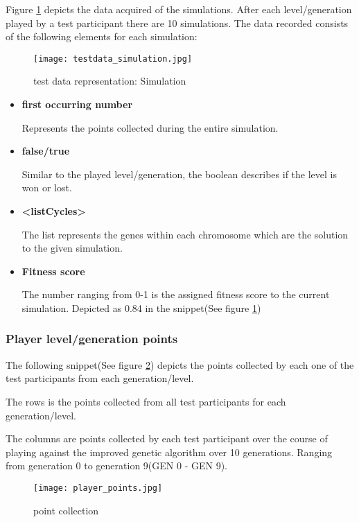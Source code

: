 \newpage
Figure \ref{fig:testdata_simulation} depicts the data acquired of the simulations. After each level/generation played by a test participant there are 10 simulations.
The data recorded consists of the following elements for each simulation:

\begin{figure}[!htbp]
\centering
\texttt{[image: testdata\_simulation.jpg]}
\caption{test data representation: Simulation}
\label{fig:testdata_simulation}
\end{figure}

\begin{itemize}
\item \textbf{first occurring number}

Represents the points collected during the entire simulation.

\item  \textbf{false/true}

Similar to the played level/generation, the boolean describes if the level is won or lost.

\item \textbf{<listCycles>}

The list represents the genes within each chromosome which are the solution to the given simulation.

\item \textbf{Fitness score}

The number ranging from 0-1 is the assigned fitness score to the current simulation. Depicted as 0.84 in the snippet(See figure \ref{fig:testdata_simulation})
\end{itemize}
\newpage
\subsubsection{Player level/generation points}
The following snippet(See figure \ref{fig:point_collection}) depicts the points collected by each one of the test participants from each generation/level.


The rows is the points collected from all test participants for each generation/level.

The columns are points collected by each test participant over the course of playing against the improved genetic algorithm over 10 generations. Ranging from generation 0 to generation 9(GEN 0 - GEN 9).
\begin{figure}[!htbp]
\centering
\texttt{[image: player\_points.jpg]}
\caption{point collection}
\label{fig:point_collection}
\end{figure}


